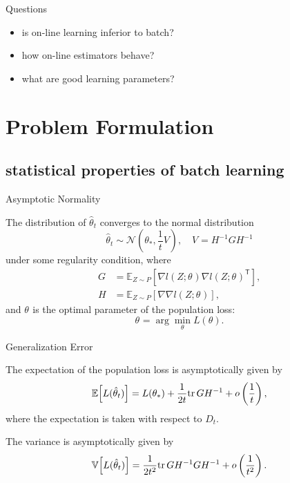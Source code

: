 \documentclass[fleqn,aspectratio=1610]{beamer}
\begin{document}
\begin{frame}[label={sec:orgc346255}]{Questions}
\begin{itemize}
\item is on-line learning inferior to batch?
\item how on-line estimators behave?
\item what are good learning parameters?
\end{itemize}
\end{frame}


\section{Problem Formulation}
\label{sec:org18757a7}
\subsection{statistical properties of batch learning}
\label{sec:orgf65dc05}
\begin{frame}[label={sec:org712b234}]{Asymptotic Normality}
\begin{lemma}[Godambe, 1991]\label{sec:org0b05ddd}
\nocite{Godambe1991}
The distribution of \(\hat{\theta}_{t}\) converges
to the normal distribution 
\begin{equation}
  \hat{\theta}_{t}
  \sim \mathcal{N}\left(\theta_*,\frac{1}{t}V_{}\right),\quad
  V_{}=H^{-1}GH^{-1}
\end{equation}
under some regularity condition, where
\begin{align}
  G
  &=\mathbb{E}_{Z\sim P}
    \left[
    \nabla l(Z;\theta_{}) \nabla l(Z;\theta_{})^{\mathsf{T}}
    \right],\\
  H
  &=\mathbb{E}_{Z\sim P}
    \left[
    \nabla\nabla l(Z;\theta_{})
    \right],
\end{align}
and \(\theta_{}\) is the optimal parameter of the population loss:
\begin{equation}
  \theta_{}
  = \arg\min_\theta L(\theta).
\end{equation}
\end{lemma}
\end{frame}

\begin{frame}[label={sec:org29dd633}]{Generalization Error}
\begin{theorem}[]\label{sec:orged10486}
The expectation of the population loss is asymptotically given by
\begin{equation}
  \mathbb{E}\Bigl[L(\hat\theta_{t})\Bigr]
  =L(\theta_*)
  +\frac{1}{2t}\mathrm{tr}\, GH^{-1}
  +o\left(\frac{1}{t}\right),
\end{equation}
where the expectation is taken with respect to \(D_{t}\).

The variance is asymptotically given by
\begin{equation}
  \mathbb{V}\Bigl[L(\hat\theta_{t})\Bigr]
  =\frac{1}{2t^2}\mathrm{tr}\, GH^{-1}GH^{-1}
  +o\left(\frac{1}{t^2}\right).
\end{equation}
\end{theorem}
\end{frame}
\end{document}
